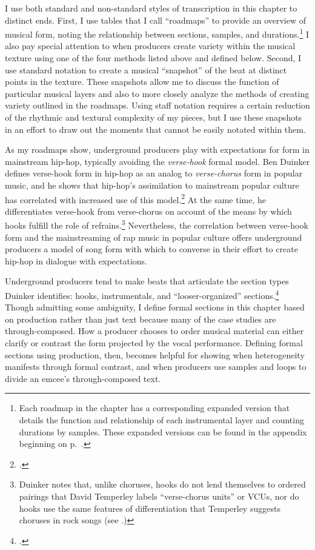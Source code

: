 I use both standard and non-standard styles of transcription in this chapter to distinct
ends. First, I use tables that I call ``roadmaps'' to provide an overview of musical form,
noting the  relationship between sections, samples, and durations.\footnote{
    Each roadmap in the chapter has a corresponding expanded version that details the 
    function and relationship of each instrumental layer and counting durations by 
    samples. These expanded versions can be found in the appendix beginning on
    p.~\pageref{appendix:fullroadmaps}.} 
I also pay special attention to when producers create variety within the musical texture
using one of the four methods listed above and defined below. Second, I use standard
notation to create a musical ``snapshot'' of the beat at distinct points in the texture.
These snapshots allow me to discuss the function of particular musical layers and also to
more closely analyze the methods of creating variety outlined in the roadmaps. Using staff
notation requires a certain reduction of the rhythmic and textural complexity of my pieces,
but I use these snapshots in an effort to draw out the moments that cannot be easily notated
within them.

As my roadmaps show, underground producers play with expectations for form in mainstream
hip-hop, typically avoiding the \emph{verse-hook} formal model. Ben Duinker defines 
verse-hook form in hip-hop as an analog to \emph{verse-chorus} form in popular music, and
he shows that hip-hop's assimilation to mainstream popular culture has correlated with
increased use of this model.\footnote{
    \autocite[105]{benduinkerSongFormMainstreaming2020}.}\label{duinkerhookdef}
At the same time, he differentiates verse-hook from verse-chorus on account of the means
by which hooks fulfill the role of refrains.\footnote{
    Duinker notes that, unlike choruses, hooks do not lend themselves to ordered 
    pairings that David Temperley labels ``verse-chorus units'' or VCUs, nor do 
    hooks use the same features of differentiation that Temperley suggests choruses
    in rock songs 
    (see \autocite[159\textit{ff}]{davidtemperleyMusicalLanguageRock2018}.)}
Nevertheless, the correlation between verse-hook form and the mainstreaming of rap music
in popular culture offers underground producers a model of song form with which to converse
in their  effort to create hip-hop in dialogue with expectations.

Underground producers tend to make beats that articulate the section types Duinker identifies:
hooks, instrumentals, and ``looser-organized'' sections.\footnote{
    \autocite[95--101]{benduinkerSongFormMainstreaming2020}.} 
Though admitting some ambiguity, I define formal sections in this chapter based on production
rather than just text because many of the case studies are through-composed. How a producer 
chooses to order musical material can either clarify or contrast the form projected by the
vocal performance. Defining formal sections using production, then, becomes helpful for
showing when heterogeneity manifests through formal contrast, and when producers use samples
and loops to divide an emcee's through-composed text.

